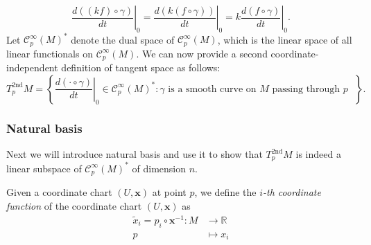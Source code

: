 \documentclass{report}
\begin{document}
$$
\left.\frac{d((kf) \circ \gamma)}{dt}\right|_0=\left.\frac{d(k(f \circ \gamma))}{dt}\right|_0=k\left.\frac{d(f \circ \gamma)}{dt}\right|_0.
$$
Let $\mathcal{C}^{\infty}_p(M)^*$ denote the dual space of $\mathcal{C}^{\infty}_p(M)$, which is the linear space of all linear functionals on $\mathcal{C}^{\infty}_p(M)$. We can now provide a second coordinate-independent definition of tangent space as follows:
$$
T^{2\mathrm{nd}}_pM=\left\{\left.\frac{d(\cdot \circ \gamma)}{dt}\right|_0\in\mathcal{C}^{\infty}_p(M)^*:\gamma\text{ is a smooth curve on $M$ passing through $p$ }\right\}.
$$
\subsubsection{Natural basis}
Next we will introduce natural basis and use it to show that $T^{2\mathrm{nd}}_pM$ is indeed a linear subspace of $\mathcal{C}^{\infty}_p(M)^*$ of dimension $n$.

Given a coordinate chart $(U,\mathbf{x})$ at point $p$, we define the \emph{$i$-th coordinate function} of the coordinate chart $(U,\mathbf{x})$ as
\[
    \begin{aligned}
        \tilde{x}_i=p_i\circ \mathbf{x}^{-1}:M&\longrightarrow \mathbb{R}\\
        p&\longmapsto x_i
    \end{aligned}
\]
\end{document}
